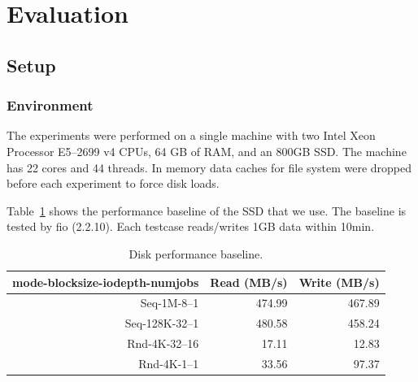 \section{Evaluation}\label{sec:experiments}
\subsection{Setup}
\subsubsection{Environment}
The experiments were performed on a single machine with two Intel Xeon Processor E5--2699 v4 CPUs, 64 GB of RAM,
and an 800GB SSD\@.
The machine has 22 cores and 44 threads.
In memory data caches for file system were dropped before each experiment to force disk loads.

Table~\ref{tab:disk} shows the performance baseline of the SSD that we use.
The baseline is tested by fio (2.2.10).
Each testcase reads/writes 1GB data within 10min.
\begin{table}
  \caption{Disk performance baseline.}\label{tab:disk}
  \begin{tabular}{rrr}
    \toprule
    mode-blocksize-iodepth-numjobs & Read (MB/s) & Write (MB/s) \\
    \midrule
    Seq-1M-8--1    & 474.99 & 467.89 \\
    Seq-128K-32--1 & 480.58 & 458.24 \\
    Rnd-4K-32--16  &  17.11 &  12.83 \\
    Rnd-4K-1--1    &  33.56 &  97.37 \\
    \bottomrule
  \end{tabular}
\end{table}
